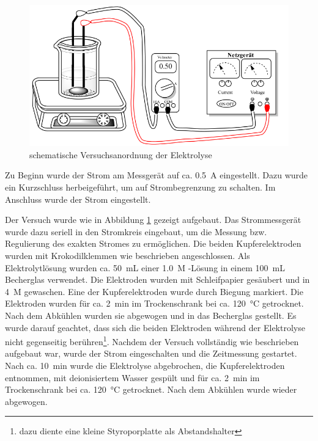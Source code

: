 \documentclass{article}
\begin{document}
        \begin{figure}[h]
          \includegraphics[scale=0.4, center]{Graphiken/Versuchsanordnungen/ElektrolyseAufbau.png} 
          \caption[schematische Versuchsanordnung Bestimmung der Faraday-Konstante, Quelle: \cite{Versuchsvorschrift}]{schematische Versuchsanordnung der Elektrolyse \cite{Versuchsvorschrift}}
          \label{fig:Versuchsanordnung}
        \end{figure}
    
        Zu Beginn wurde der Strom am Messgerät auf ca. \SI[mode=text]{0.5}{\ampere} eingestellt. Dazu wurde ein Kurzschluss herbeigeführt, um auf Strombegrenzung zu schalten. Im Anschluss wurde der Strom eingestellt. 
        
        Der Versuch wurde wie in Abbildung \ref{fig:Versuchsanordnung} gezeigt aufgebaut. Das Strommessgerät wurde dazu seriell in den Stromkreis eingebaut, um die Messung bzw. Regulierung des exakten Stromes zu ermöglichen. Die beiden Kupferelektroden wurden mit Krokodilklemmen wie beschrieben angeschlossen. Als Elektrolytlösung wurden ca. \SI[mode=text]{50}{\milli\liter} einer \SI[mode=text]{1.0}{M} -Lösung in einem \SI[mode=text]{100}{\milli\liter} Becherglas verwendet. Die Elektroden wurden mit Schleifpapier gesäubert und in \SI[mode=text]{4}{M}  gewaschen. Eine der Kupferelektroden wurde durch Biegung markiert. Die Elektroden wurden für ca. \SI[mode=text]{2}{\minute} im Trockenschrank bei ca. \SI[mode=text]{120}{\degreeCelsius} getrocknet. Nach dem Abkühlen wurden sie abgewogen und in das Becherglas gestellt. Es wurde darauf geachtet, dass sich die beiden Elektroden während der Elektrolyse nicht gegenseitig berühren\footnote{dazu diente eine kleine Styroporplatte als Abstandshalter}. Nachdem der Versuch vollständig wie beschrieben aufgebaut war, wurde der Strom eingeschalten und die Zeitmessung gestartet. Nach ca. \SI[mode=text]{10}{\minute} wurde die Elektrolyse abgebrochen, die Kupferelektroden entnommen, mit deionisiertem Wasser gespült und für ca. \SI[mode=text]{2}{\minute} im Trockenschrank bei ca. \SI[mode=text]{120}{\degreeCelsius} getrocknet. Nach dem Abkühlen wurde wieder abgewogen. 
        
\end{document}
